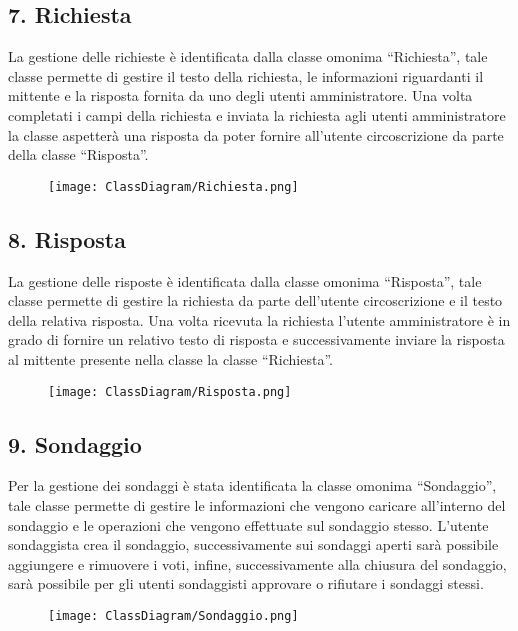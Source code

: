     \subsection*{7. Richiesta}
        La gestione delle richieste è identificata dalla classe omonima ``Richiesta'', tale classe permette di gestire il testo della richiesta, le informazioni riguardanti il mittente e la risposta fornita da uno degli utenti amministratore. Una volta completati i campi della richiesta e inviata la richiesta agli utenti amministratore la classe aspetterà una risposta da poter fornire all'utente circoscrizione da parte della classe ``Risposta''.
        \begin{figure}[H]
            \texttt{[image: ClassDiagram/Richiesta.png]}
        \end{figure}
    
    \subsection*{8. Risposta}
        La gestione delle risposte è identificata dalla classe omonima ``Risposta'', tale classe permette di gestire la richiesta da parte dell'utente circoscrizione e il testo della relativa risposta. Una volta ricevuta la richiesta l'utente amministratore è in grado di fornire un relativo testo di risposta e successivamente inviare la risposta al mittente presente nella classe la classe ``Richiesta''.
        \begin{figure}[H]
            \texttt{[image: ClassDiagram/Risposta.png]}
        \end{figure}

    \subsection*{9. Sondaggio}
        Per la gestione dei sondaggi è stata identificata la classe omonima ``Sondaggio'', tale classe permette di gestire le informazioni che vengono caricare all'interno del sondaggio e le operazioni che vengono effettuate sul sondaggio stesso. L'utente sondaggista crea il sondaggio, successivamente sui sondaggi aperti sarà possibile aggiungere e rimuovere i voti, infine, successivamente alla chiusura del sondaggio, sarà possibile per gli utenti sondaggisti approvare o rifiutare i sondaggi stessi.
        \begin{figure}[H]
            \texttt{[image: ClassDiagram/Sondaggio.png]}
        \end{figure}
    
